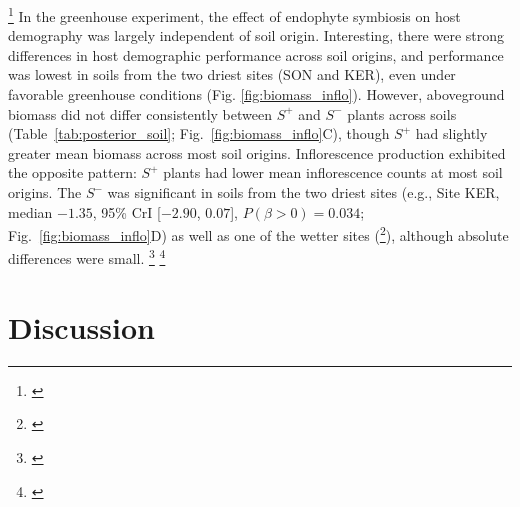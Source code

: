 \documentclass[12pt]{article}\usepackage[]{graphicx}\usepackage[dvipsnames]{xcolor}
\newcommand{\tom}[2]{{\color{red}{#1}}\footnote{\textit{\color{red}{#2}}}}
\begin{document}
\tom{}{I would use a new subsection here.}
In the greenhouse experiment, the effect of endophyte symbiosis on host demography was largely independent of soil origin. 
Interesting, there were strong differences in host demographic performance across soil origins, and performance was lowest in soils from the two driest sites (SON and KER), even under favorable greenhouse conditions (Fig. \ref{fig:biomass_inflo}). 
However, aboveground biomass did not differ consistently between $S^{+}$ and $S^{-}$ plants across soils (Table~\ref{tab:posterior_soil}; Fig.~\ref{fig:biomass_inflo}C), though $S^{+}$ had slightly greater mean biomass across most soil origins. 
Inflorescence production exhibited the opposite pattern: $S^{+}$ plants had lower mean inflorescence counts at most soil origins. 
The $S^{-}$ was significant in soils from the two driest sites (e.g., Site KER, median $-1.35$, 95\% CrI [$-2.90$, $0.07$], $P(\beta>0)=0.034$; Fig.~\ref{fig:biomass_inflo}D) as well as one of the wetter sites (\tom{}{give stats for COL}), although absolute differences were small. 
\tom{Total spikelet production mirrored this trend, with the strongest reduction at Site SON (median $-0.95$, 95\% CrI [$-2.26$, $0.34$], $P(\beta>0)=0.093$).}{Is this result in a supplement figure? I cannot find it.}
\tom{}{Just an idea here, but it could be interesting to analyze the greenhouse data in the same way as the field data, using 30-year normals for precipitation of each soil original and analyzing precip as a fixed-effect covariate. This would make for a more direct comparison between the field and greenhouse results. I think the null expectation would be that the precipitation interaction would endophyte status disappears for the greenhouse data.}


\section*{Discussion}
\end{document}
